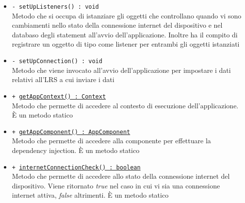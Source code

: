 \documentclass[../Tesi.tex]{subfiles}
\begin{document}
\begin{description}
\begin{itemize}
				\item \texttt{- setUpListeners() : void}\\
				Metodo che si occupa di istanziare gli oggetti che controllano quando vi sono cambiamenti nello stato della connessione internet del dispositivo e nel databaso degli statement all'avvio dell'applicazione. Inoltre ha il compito di registrare un oggetto di tipo  come listener per entrambi gli oggetti istanziati

				\item \texttt{- setUpConnection() : void}\\
				Metodo che viene invocato all'avvio dell'applicazione per impostare i dati relativi all'LRS a cui inviare i dati

				\item \texttt{+ \underline{getAppContext() : Context}}\\
				Metodo che permette di accedere al contesto di esecuzione dell'applicazione. È un metodo statico

				\item \texttt{+ \underline{getAppComponent() : AppComponent}}\\
				Metodo che permette di accedere alla componente per effettuare la dependency injection. È un metodo statico

				\item \texttt{+ \underline{internetConnectionCheck() : boolean}}\\
				Metodo che permette di accedere allo stato della connessione internet del dispositivo. Viene ritornato \textit{true} nel caso in cui vi sia una connessione internet attiva, \textit{false} altrimenti. È un metodo statico
			\end{itemize}
		\end{description}
\end{document}
